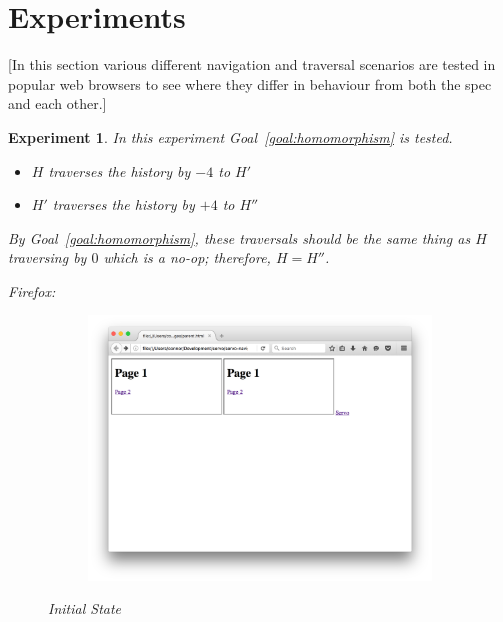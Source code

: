 \documentclass{article}
\newcommand{\aNH}{H}
\newtheorem{experiment}{Experiment}
\begin{document}
\section{Experiments}

[In this section various different navigation and traversal scenarios are tested in popular web browsers to see where they differ in behaviour from both the spec and each other.]

\begin{experiment}
  In this experiment Goal~\ref{goal:homomorphism} is tested.
  \begin{itemize}
    \item \emph{$\aNH$ traverses the history by $-4$ to $\aNH'$}
    \item \emph{$\aNH'$ traverses the history by $+4$ to $\aNH''$}
  \end{itemize}
  By Goal~\ref{goal:homomorphism}, these traversals should be the same thing as \emph{$\aNH$ traversing by $0$} which is a no-op; therefore, $\aNH = \aNH''$.

  Firefox:
  \begin{figure}[H]
    \begin{subfigure}{0.65\textwidth}
      \includegraphics[width=\linewidth]{images/experiments/forwardback4/firefox/1.png}
    \end{subfigure}
    \begin{subfigure}{0.25\textwidth}
    \end{subfigure}
    \caption{Initial State}
  \end{figure}


\end{experiment}
\end{document}
